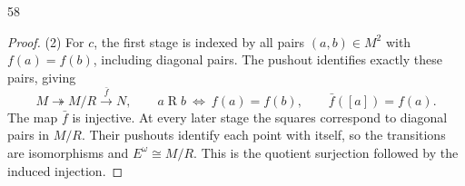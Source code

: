 \begin{exercise}{58}
\begin{proof}
(2) For $c$, the first stage is indexed by all pairs
$(a,b)\in M^2$ with $f(a)=f(b)$, including diagonal pairs.
The pushout identifies exactly these pairs, giving
\[
 M\twoheadrightarrow M/R\xrightarrow{\ \bar f\ }N,
 \qquad a\mathrel R b\ \Longleftrightarrow\ f(a)=f(b),
 \qquad \bar f([a])=f(a).
\]
The map $\bar f$ is injective.
At every later stage the squares correspond to diagonal pairs
in $M/R$. Their pushouts identify each point with itself,
so the transitions are isomorphisms and
$E^{\omega}\cong M/R$.
This is the quotient surjection followed by the induced injection.
\end{proof}
\end{exercise}
